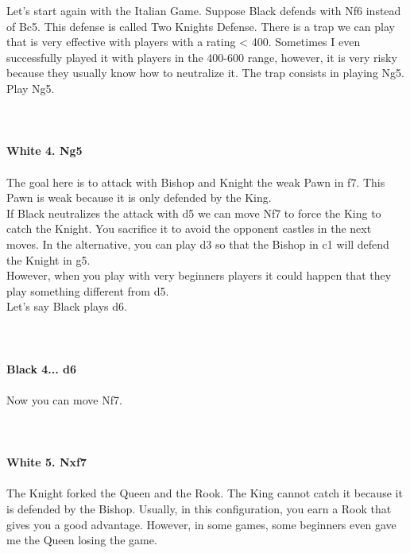 \documentclass{article}
\begin{document}
Let's start again with the Italian Game. Suppose Black defends with Nf6 instead of Bc5. This defense is called Two Knights Defense. There is a trap we can play that is very effective with players with a rating < 400. Sometimes I even successfully played it with players in the 400-600 range, however, it is very risky because they usually know how to neutralize it. The trap consists in playing Ng5. Play Ng5.\\
\\

\\
\\
\textbf{White 4. Ng5}\\
\\
The goal here is to attack with Bishop and Knight the weak Pawn in f7. This Pawn is weak because it is only defended by the King.\\If Black neutralizes the attack with d5 we can move Nf7 to force the King to catch the Knight. You sacrifice it to avoid the opponent castles in the next moves. In the alternative, you can play d3 so that the Bishop in c1 will defend the Knight in g5.\\However, when you play with very beginners players it could happen that they play something different from d5.\\Let's say Black plays d6.\\
\\

\\
\\
\textbf{Black 4... d6}\\
\\
Now you can move Nf7.\\
\\

\\
\\
\textbf{White 5. Nxf7}\\
\\
The Knight forked the Queen and the Rook. The King cannot catch it because it is defended by the Bishop. Usually, in this configuration, you earn a Rook that gives you a good advantage. However, in some games, some beginners even gave me the Queen losing the game.\\
\\
\end{document}
